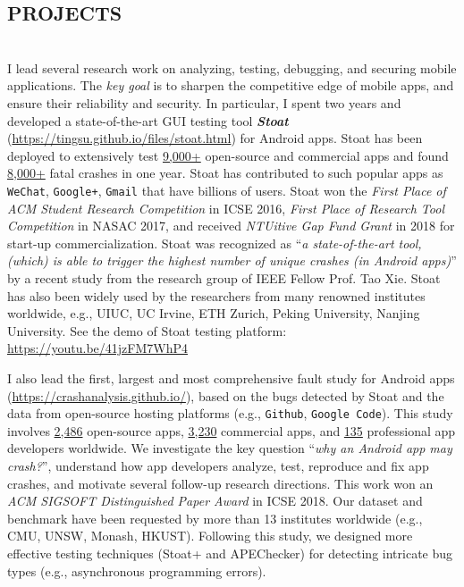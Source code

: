 \documentclass[margin]{res}
\begin{document}
\begin{resume}
\section{PROJECTS}
\\
I lead several research work on analyzing, testing, debugging, and securing mobile applications. The \emph{key goal} is to sharpen the competitive edge of mobile apps, and ensure their reliability and security.
In particular, I spent two years and developed a state-of-the-art GUI testing tool \emph{\textbf{Stoat}} (\url{https://tingsu.github.io/files/stoat.html}) for Android apps.
Stoat has been deployed to extensively test \underline{9,000+} open-source and commercial apps and found \underline{8,000+} fatal crashes in one year. Stoat has contributed to such popular apps as \texttt{WeChat}, \texttt{Google+}, \texttt{Gmail} that have billions of users. Stoat won the \emph{First Place of ACM Student Research Competition} in ICSE 2016, \emph{First Place of Research Tool Competition} in NASAC 2017, and received \emph{NTUitive Gap Fund Grant} in 2018 for start-up commercialization. Stoat was recognized as ``\emph{a state-of-the-art tool, (which) is able to trigger the highest number of unique crashes (in Android apps)}'' by a recent study from the research group of IEEE Fellow Prof. Tao Xie. Stoat has also been widely used by the researchers from many renowned institutes worldwide, e.g., UIUC, UC Irvine, ETH Zurich, Peking University, Nanjing University. See the demo of Stoat testing platform: \url{https://youtu.be/41jzFM7WhP4}

I also lead the first, largest and most comprehensive fault study for Android apps (\url{https://crashanalysis.github.io/}), based on the bugs detected by Stoat and the data from open-source hosting platforms (e.g., \texttt{Github}, \texttt{Google Code}). This study involves \underline{2,486} open-source apps, \underline{3,230} commercial apps, and \underline{135} professional app developers worldwide. We investigate the key question ``\emph{why an Android app may crash?}'', understand how app developers analyze, test, reproduce and fix app crashes, and motivate several follow-up research directions. This work won an \emph{ACM SIGSOFT Distinguished Paper Award} in ICSE 2018. Our dataset and benchmark have been requested by more than 13 institutes worldwide (e.g., CMU, UNSW, Monash, HKUST). Following this study, we designed more effective testing techniques (Stoat+ and APEChecker) for detecting intricate bug types (e.g., asynchronous programming errors).


\end{resume}
\end{document}
